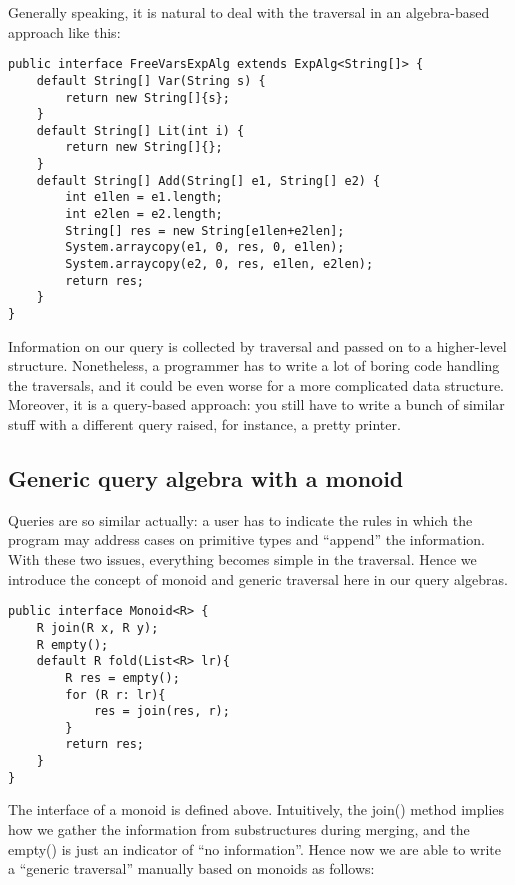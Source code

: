 Generally speaking, it is natural to deal with the traversal in an algebra-based approach like this:

\begin{lstlisting}[numbers=none]
public interface FreeVarsExpAlg extends ExpAlg<String[]> {
    default String[] Var(String s) {
        return new String[]{s};
    }
    default String[] Lit(int i) {
        return new String[]{};
    }
    default String[] Add(String[] e1, String[] e2) {
        int e1len = e1.length;
        int e2len = e2.length;
        String[] res = new String[e1len+e2len];
        System.arraycopy(e1, 0, res, 0, e1len);
        System.arraycopy(e2, 0, res, e1len, e2len);
        return res;
    }
}
\end{lstlisting}

Information on our query is collected by traversal and passed on to a
higher-level structure. Nonetheless, a programmer has to write a lot
of boring code handling the traversals, and it could be even worse for
a more complicated data structure. Moreover, it is a query-based
approach: you still have to write a bunch of similar stuff with a
different query raised, for instance, a pretty printer.

\subsection{Generic query algebra with a monoid}\label{subsec:genericquery}

Queries are so similar actually: a user has to indicate the rules in
which the program may address cases on primitive types and ``append''
the information. With these two issues, everything becomes simple in
the traversal. Hence we introduce the concept of monoid and generic
traversal here in our query algebras.

\begin{lstlisting}[numbers=none]
public interface Monoid<R> {
    R join(R x, R y);
    R empty();
    default R fold(List<R> lr){
    	R res = empty();
    	for (R r: lr){
    		res = join(res, r);
    	}
    	return res;
    }
}
\end{lstlisting}

The interface of a monoid is defined above. Intuitively, the join()
method implies how we gather the information from substructures during
merging, and the empty() is just an indicator of ``no
information''. Hence now we are able to write a ``generic traversal''
manually based on monoids as follows:

